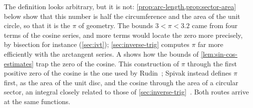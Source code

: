 The definition looks arbitrary, but it is not: \cref{prop:arc-length,prop:sector-area} below show that this number is half the circumference and the area of the unit circle, so that it is the $\pi$ of geometry. The bounds $3<\pi<3.2$ came from four terms of the cosine series, and more terms would locate the zero more precisely, by bisection for instance (\cref{sec:ivt}); \cref{sec:inverse-trig} computes $\pi$ far more efficiently with the arctangent series. A shows how the bounds of \cref{lem:sin-cos-estimates} trap the zero of the cosine. This construction of $\pi$ through the first positive zero of the cosine is the one used by Rudin~\cite{rudin1976}; Spivak instead defines $\pi$ first, as the area of the unit disc, and the cosine through the area of a circular sector, an integral closely related to those of \cref{sec:inverse-trig}~\cite{spivak2008calculus}. Both routes arrive at the same functions.

